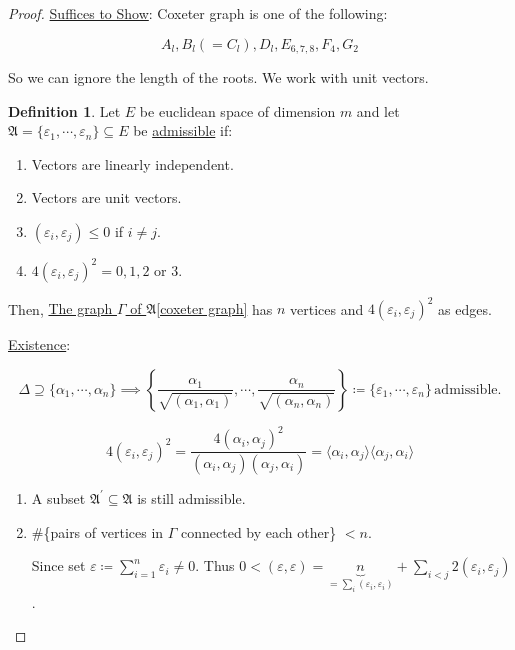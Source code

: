 \documentclass{article}
\theoremstyle{definition}
\newtheorem*{definition}{Definition}
\begin{document}
\begin{proof}
    \underline{Suffices to Show}: Coxeter graph is one of the following:

    \[
        A_l, B_l (= C_l), D_l, E_{6,7,8}, F_4, G_2
    \]

    So we can ignore the length of the roots. We work with unit vectors.

    \begin{definition}
        Let \(E\) be euclidean space of dimension \(m\) and let \(\mathfrak{A} = \{ \varepsilon_1, \cdots , \varepsilon_n \} \subseteq E\) be \underline{admissible} if:

        \begin{enumerate}[label=\arabic*)]
            \item Vectors are linearly independent.
            \item Vectors are unit vectors.
            \item \((\varepsilon_i, \varepsilon_j)\leq 0\) if \(i \neq j\).
            \item \(4(\varepsilon_i, \varepsilon_j)^2 = 0,1,2\) or \(3\). 
        \end{enumerate} 

    \end{definition}

    Then, \underline{The graph \(\Gamma\) of \(\mathfrak{A}\)[coxeter graph]} has \(n\) vertices and \(4(\varepsilon_i, \varepsilon_j)^2\) as edges.

    \underline{Existence}:

    \[
        \Delta \supseteq \{ \alpha_1, \cdots , \alpha_n \} \implies \left\{ \frac{\alpha_1}{\sqrt{(\alpha_1, \alpha_1)}}, \cdots , \frac{\alpha_n}{\sqrt{(\alpha_n, \alpha_n)} } \right\} \coloneqq \{ \varepsilon_1, \cdots , \varepsilon_n \} \, \text{admissible}. 
        \]

    \[
        4 (\varepsilon_i, \varepsilon_j)^2 = \frac{4(\alpha_i, \alpha_j)^2}{(\alpha_i, \alpha_j)(\alpha_j, \alpha_i)} = \langle \alpha_i, \alpha_j \rangle \langle \alpha_j, \alpha_i \rangle
    \]

    \begin{enumerate}[label=\arabic*)]
        \item A subset \(\mathfrak{A} ^{\prime} \subseteq \mathfrak{A}\) is still admissible.
        \item \#\{pairs of vertices in \(\Gamma\) connected by each other\} \(< n\).
        
        Since set \(\varepsilon \coloneqq \sum_{i=1}^n \varepsilon_i \neq 0\). Thus \(0 < (\varepsilon, \varepsilon) = \underbrace{n}_{=\sum_{i} (\varepsilon_i, \varepsilon_i)} + \sum_{i<j} 2 (\varepsilon_i, \varepsilon_j)\).
        

\end{enumerate}
\end{proof}
\end{document}
